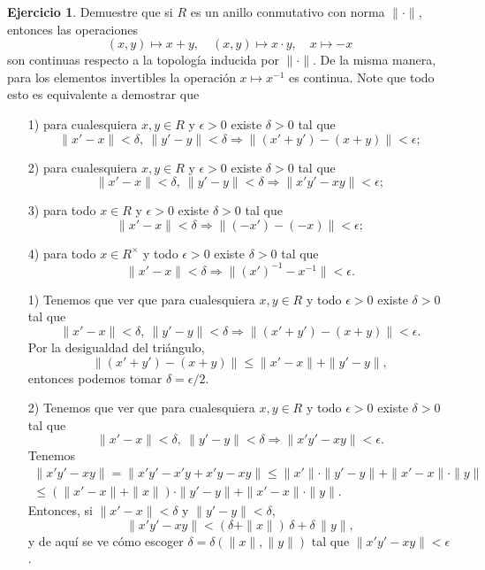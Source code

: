 \documentclass{article}
\numberwithin{equation}{section}
\theoremstyle{definition}
\newtheorem{ejerc}{Ejercicio}
\begin{document}
\begin{ejerc}
  Demuestre que si $R$ es un anillo conmutativo con norma $\|\cdot\|$, entonces
  las operaciones
  $$(x,y) \mapsto x+y, \quad (x,y) \mapsto x\cdot y, \quad x \mapsto -x$$
  son continuas respecto a la topología inducida por $\|\cdot\|$. De la misma
  manera, para los elementos invertibles la operación $x \mapsto x^{-1}$ es
  continua. Note que todo esto es equivalente a demostrar que

  \begin{enumerate}
  \item[1)] para cualesquiera $x,y\in R$ y $\epsilon > 0$ existe $\delta > 0$
    tal que
    \[ \|x'-x\| < \delta, ~ \|y'-y\| < \delta \Longrightarrow
       \|(x'+y') - (x+y)\| < \epsilon; \]

  \item[2)] para cualesquiera $x,y\in R$ y $\epsilon > 0$ existe $\delta > 0$
    tal que
    \[ \|x'-x\| < \delta, ~ \|y'-y\| < \delta \Longrightarrow
       \|x'y' - xy\| < \epsilon; \]

  \item[3)] para todo $x\in R$ y $\epsilon > 0$ existe $\delta > 0$ tal que
    $$\|x'-x\| < \delta \Longrightarrow \|(-x') - (-x)\| < \epsilon;$$

  \item[4)] para todo $x\in R^\times$ y todo $\epsilon > 0$ existe $\delta > 0$
    tal que
    $$\|x'-x\| < \delta \Longrightarrow \|(x')^{-1} - x^{-1}\| < \epsilon.$$
  \end{enumerate}

  \ifdefined\solutions\begin{solucion}
    \begin{enumerate}
    \item[1)] Tenemos que ver que para cualesquiera $x,y\in R$ y todo
      $\epsilon > 0$ existe $\delta > 0$ tal que
      \[ \|x'-x\| < \delta, ~ \|y'-y\| < \delta \Longrightarrow
         \|(x'+y') - (x+y)\| < \epsilon. \]
      Por la desigualdad del triángulo,
      $$\|(x'+y') - (x+y)\| \le \|x'-x\| + \|y'-y\|,$$
      entonces podemos tomar $\delta = \epsilon/2$.

    \item[2)] Tenemos que ver que para cualesquiera $x,y\in R$ y todo
      $\epsilon > 0$ existe $\delta > 0$ tal que
      \[ \|x'-x\| < \delta, ~ \|y'-y\| < \delta \Longrightarrow
         \|x'y' - xy\| < \epsilon. \]
      Tenemos
      \begin{multline*}
        \|x'y' - xy\| = \|x'y' - x'y + x'y - xy\| \le
        \|x'\|\cdot \|y'-y\| + \|x'-x\|\cdot \|y\| \\
        \le (\|x' - x\| + \|x\|)\cdot \|y'-y\| + \|x'-x\|\cdot \|y\|.
      \end{multline*}
      Entonces, si $\|x'-x\| < \delta$ y $\|y'-y\| < \delta$,
      $$\|x'y' - xy\| < (\delta + \|x\|)\,\delta + \delta\,\|y\|,$$
      y de aquí se ve cómo escoger $\delta = \delta (\|x\|, \|y\|)$ tal que
      $\|x'y' - xy\| < \epsilon$.


\end{enumerate}
\end{solucion}
\end{ejerc}
\end{document}
